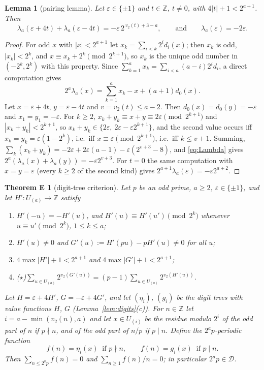 \documentclass[11pt,a4paper]{article}
\newtheorem{lemma}[theorem]{Lemma}
\newtheorem*{thmE}{Theorem E}
\theoremstyle{definition}
\theoremstyle{remark}
\newcommand{\Z}{\mathbb{Z}}
\newcommand{\cD}{\mathcal{D}}
\newcommand{\Uu}[1]{U_{(#1)}}
\begin{document}
\begin{lemma}[pairing lemma]\label{lem:pairing}
Let $\varepsilon\in\{\pm1\}$ and $t\in\Z$, $t\neq0$, with $4|t|+1<2^{a+1}$. Then
\[
\lambda_a(\varepsilon+4t)+\lambda_a(\varepsilon-4t)=-\varepsilon\,2^{\,v_2(t)+3-a},\qquad\text{and}\qquad \lambda_a(\varepsilon)=-2\varepsilon .
\]
\end{lemma}

\begin{proof}
For odd $x$ with $|x|<2^{a+1}$ let $x_k=\sum_{i<k}2^id_i(x)$; then $x_k$ is odd, $|x_k|<2^k$, and $x\equiv x_k+2^k\pmod{2^{k+1}}$, so $x_k$ is the unique odd number in $(-2^k,2^k)$ with this property. Since $\sum_{k=1}^ax_k=\sum_{i<a}(a-i)2^id_i$, a direct computation gives
\begin{equation}\label{eq:Lambda}
2^a\lambda_a(x)=\sum_{k=1}^ax_k-x+(a+1)d_0(x).
\end{equation}
Let $x=\varepsilon+4t$, $y=\varepsilon-4t$ and $v=v_2(t)\le a-2$. Then $d_0(x)=d_0(y)=-\varepsilon$ and $x_1=y_1=-\varepsilon$. For $k\ge2$, $x_k+y_k\equiv x+y\equiv2\varepsilon\pmod{2^{k+1}}$ and $|x_k+y_k|<2^{k+1}$, so $x_k+y_k\in\{2\varepsilon,\ 2\varepsilon-\varepsilon2^{k+1}\}$, and the second value occurs iff $x_k=y_k=\varepsilon(1-2^k)$, i.e.\ iff $x\equiv\varepsilon\pmod{2^{k+1}}$, i.e.\ iff $k\le v+1$. Summing,
$\sum_k(x_k+y_k)=-2\varepsilon+2\varepsilon(a-1)-\varepsilon(2^{v+3}-8)$, and \eqref{eq:Lambda} gives $2^a(\lambda_a(x)+\lambda_a(y))=-\varepsilon2^{v+3}$. For $t=0$ the same computation with $x=y=\varepsilon$ (every $k\ge2$ of the second kind) gives $2^{a+1}\lambda_a(\varepsilon)=-\varepsilon2^{a+2}$.
\end{proof}

\begin{thmE}[digit-tree criterion]
Let $p$ be an odd prime, $a\ge2$, $\varepsilon\in\{\pm1\}$, and let $H'\colon\Uu a\to\Z$ satisfy
\begin{enumerate}[label=\textup{(\roman*)}]
\item $H'(-u)=-H'(u)$, and $H'(u)\equiv H'(u')\pmod{2^k}$ whenever $u\equiv u'\pmod{2^k}$, $1\le k\le a$;
\item $H'(u)\neq0$ and $G'(u):=H'(pu)-pH'(u)\neq0$ for all $u$;
\item $4\max|H'|+1<2^{a+1}$ and $4\max|G'|+1<2^{a+1}$;
\item \textup{($\star$)}\quad $\displaystyle\sum_{u\in\Uu a}2^{v_2(G'(u))}=(p-1)\sum_{u\in\Uu a}2^{v_2(H'(u))}$.
\end{enumerate}
Let $H=\varepsilon+4H'$, $G=-\varepsilon+4G'$, and let $(\eta_i)$, $(g_i)$ be the digit trees with value functions $H$, $G$ \textup{(}Lemma~\ref{lem:digits}(c)\textup{)}. For $n\in\Z$ let $i=a-\min(v_2(n),a)$ and let $x\in\Uu i$ be the residue modulo $2^i$ of the odd part of $n$ if $p\nmid n$, and of the odd part of $n/p$ if $p\mid n$. Define the $2^ap$-periodic function
\[
f(n)=\eta_i(x)\ \text{ if }p\nmid n,\qquad f(n)=g_i(x)\ \text{ if }p\mid n .
\] Then $\sum_{n\le 2^ap}f(n)=0$ and $\sum_{n\ge1}f(n)/n=0$; in particular $2^ap\in\cD$.
\end{thmE}
\end{document}
